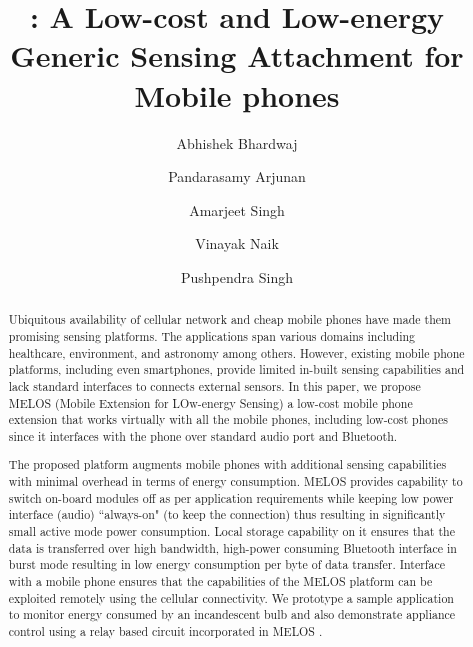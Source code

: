\documentclass[10pt]{sigplan-proc-varsize}
\author[2]{Abhishek Bhardwaj}
\author[1]{Pandarasamy Arjunan }
\author[1]{Amarjeet Singh }
\author[1]{Vinayak Naik}
\author[1]{Pushpendra Singh}
\affil[1]{Indrapratha Institute of Information Technology, New Delhi, India}
\affil[2]{Netaji Subhash Institute of Technology, New Delhi, India}
\title{\vspace{-5mm} \melos: A Low-cost and Low-energy Generic Sensing Attachment for Mobile phones \vspace{-7mm}}
\newcommand{\melos}{MELOS }
\begin{document}
\maketitle


\begin{abstract}
Ubiquitous availability of cellular network and cheap mobile phones have made them promising sensing platforms. The applications span various domains including healthcare, environment, and astronomy among others. However, existing mobile phone platforms, including even smartphones, provide limited in-built sensing capabilities and lack standard interfaces to connects external sensors. In this paper, we propose \melos (Mobile Extension for LOw-energy Sensing) a low-cost mobile phone extension that works virtually with all the mobile phones, including low-cost phones since it interfaces with the phone over standard audio port and Bluetooth. 

The proposed platform augments mobile phones with additional sensing capabilities with minimal overhead in terms of energy consumption. \melos provides capability to switch on-board modules off as per application requirements while keeping low power interface (audio) ``always-on" (to keep the connection) thus resulting in significantly small active mode power consumption. Local storage capability on it ensures that the data is transferred over high bandwidth, high-power consuming Bluetooth interface in burst mode resulting in low energy consumption per byte of data transfer. Interface with a mobile phone ensures that the capabilities of the \melos platform can be exploited remotely using the cellular connectivity. We prototype a sample application to monitor energy consumed by an incandescent bulb and also demonstrate appliance control using a relay based circuit incorporated in \melos . 
\end{abstract}

%
%



\end{document}
